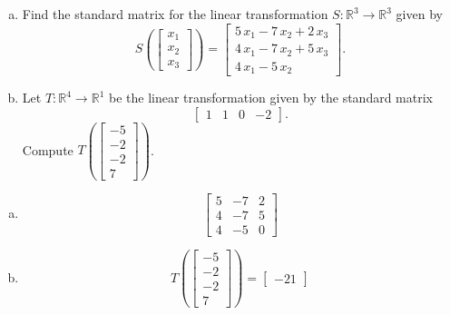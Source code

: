 
\begin{exerciseStatement}

\begin{enumerate}[(a)]
\item Find the standard matrix for the linear transformation \(S:\mathbb{R}^ 3  \to \mathbb{R}^ 3 \) given by \[S\left(  \left[\begin{array}{c}
x_{1} \\
x_{2} \\
x_{3}
\end{array}\right]  \right) =  \left[\begin{array}{c}
5 \, x_{1} - 7 \, x_{2} + 2 \, x_{3} \\
4 \, x_{1} - 7 \, x_{2} + 5 \, x_{3} \\
4 \, x_{1} - 5 \, x_{2}
\end{array}\right] .\]
\item Let \(T:\mathbb{R}^ 4  \to \mathbb{R}^ 1 \) be the linear transformation given by the standard matrix \[ \left[\begin{array}{cccc}
1 & 1 & 0 & -2
\end{array}\right] .\] Compute \(T\left( \left[\begin{array}{c}
-5 \\
-2 \\
-2 \\
7
\end{array}\right]  \right)\). 
\end{enumerate}
    
\end{exerciseStatement}
    
\begin{exerciseAnswer} 

\begin{enumerate}[(a)]
\item \[ \left[\begin{array}{ccc}
5 & -7 & 2 \\
4 & -7 & 5 \\
4 & -5 & 0
\end{array}\right] \]
\item \[T\left( \left[\begin{array}{c}
-5 \\
-2 \\
-2 \\
7
\end{array}\right]  \right)= \left[\begin{array}{c}
-21
\end{array}\right] \]
\end{enumerate}
    
\end{exerciseAnswer}
    
